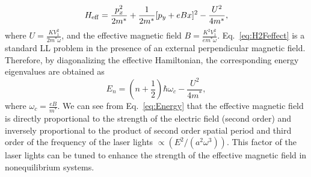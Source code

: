 \begin{equation} \label{eq:H2Feffect}
H_{\rm eff}=\frac{p_{x}^{2}}{2m^{\ast}}+\frac{1}{2m^{\ast}}[p_{y}%
+eBx]^{2}-\frac{U^{2}}{4m^{\ast}},
\end{equation}
where $U=\frac{KV_{1}^{2}}{2m^{\ast}\omega}$, and the effective magnetic field
$B=\frac{K^{2}V_{1}^{2}}{em^{\ast}\omega}$. Eq.~\eqref{eq:H2Feffect} is a standard LL problem in the presence of an external perpendicular
magnetic field. Therefore, by diagonalizing the effective Hamiltonian, the corresponding energy eigenvalues are obtained as%
\begin{equation} \label{eq:Energy}
E_{n}=(n+\frac{1}{2})\hbar\omega_{c}-\frac{U^{2}}{4m^{\ast}},
\end{equation}
where $\omega_{c}=\frac{eB}{m^{\ast}}$. We can see from Eq.~\eqref{eq:Energy} that the effective magnetic field is directly proportional to the strength of the electric field (second order) and inversely proportional to the product of second order spatial period and third order of the frequency of the laser lights $\propto (E^2/(a^2\omega^3))$. This factor of the laser lights can be tuned to enhance the strength of the effective magnetic field in nonequilibrium systems.

